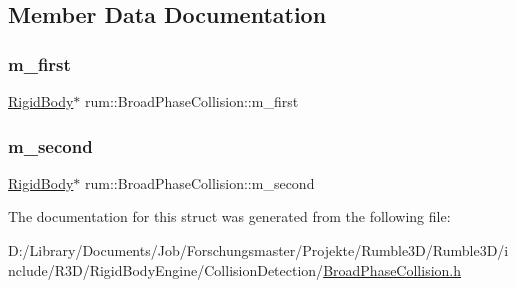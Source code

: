 \subsection{Member Data Documentation}
\mbox{\label{structrum_1_1_broad_phase_collision_a31f6b464da91dd2236795ecfbf1b13fc}} 
\subsubsection{\texorpdfstring{m\+\_\+first}{m\_first}}
{\footnotesize\ttfamily \mbox{\hyperlink{classrum_1_1_rigid_body}{Rigid\+Body}}$\ast$ rum\+::\+Broad\+Phase\+Collision\+::m\+\_\+first}

\mbox{\label{structrum_1_1_broad_phase_collision_a2357209b8ccc907b694f9642cce213bb}} 
\subsubsection{\texorpdfstring{m\+\_\+second}{m\_second}}
{\footnotesize\ttfamily \mbox{\hyperlink{classrum_1_1_rigid_body}{Rigid\+Body}}$\ast$ rum\+::\+Broad\+Phase\+Collision\+::m\+\_\+second}



The documentation for this struct was generated from the following file\+:\begin{DoxyCompactItemize}
\item 
D\+:/\+Library/\+Documents/\+Job/\+Forschungsmaster/\+Projekte/\+Rumble3\+D/\+Rumble3\+D/include/\+R3\+D/\+Rigid\+Body\+Engine/\+Collision\+Detection/\mbox{\hyperlink{_broad_phase_collision_8h}{Broad\+Phase\+Collision.\+h}}\end{DoxyCompactItemize}
